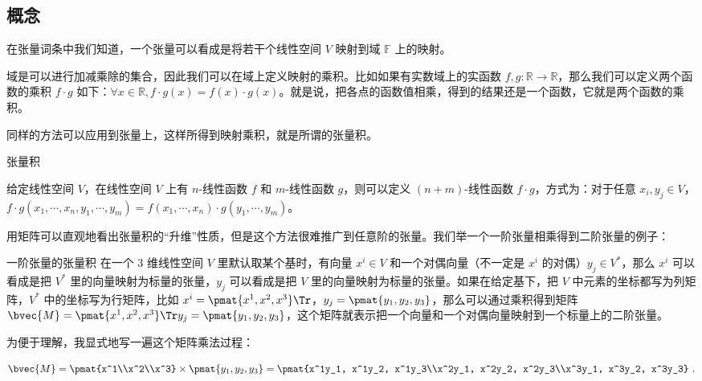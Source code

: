 
\begin{issues}
\end{issues}



\subsection{概念}
在张量词条中我们知道，一个张量可以看成是将若干个线性空间 $V$ 映射到域 $\mathbb{F}$ 上的映射。

域是可以进行加减乘除的集合，因此我们可以在域上定义映射的乘积。比如如果有实数域上的实函数 $f, g:\mathbb{R} \rightarrow \mathbb{R}$，那么我们可以定义两个函数的乘积 $f \cdot g$ 如下：$\forall x \in \mathbb{R}, f \cdot g(x) = f(x) \cdot g(x)$。就是说，把各点的函数值相乘，得到的结果还是一个函数，它就是两个函数的乘积。

同样的方法可以应用到张量上，这样所得到映射乘积，就是所谓的张量积。

\begin{definition}{张量积}\label{def_TsrPrd_1}

给定线性空间 $V$，在线性空间 $V$ 上有 $n$-线性函数 $f$ 和 $m$-线性函数 $g$，则可以定义 $(n+m)$-线性函数 $f\cdot g$，方式为：对于任意 $x_i, y_j\in V$，$f\cdot g(x_1, \cdots, x_n, y_1, \cdots, y_m)=f(x_1, \cdots, x_n)\cdot g(y_1, \cdots, y_m)$。

\end{definition}

用矩阵可以直观地看出张量积的“升维”性质，但是这个方法很难推广到任意阶的张量。我们举一个一阶张量相乘得到二阶张量的例子：

\begin{example}{一阶张量的张量积}
在一个 $3$ 维线性空间 $V$ 里默认取某个基时，有向量 $x^i\in V$ 和一个对偶向量（不一定是 $x^i$ 的对偶）$y_j\in V^*$，那么 $x^i$ 可以看成是把 $V^*$ 里的向量映射为标量的张量，$y_j$ 可以看成是把 $V$ 里的向量映射为标量的张量。如果在给定基下，把 $V$ 中元素的坐标都写为列矩阵，$V^*$ 中的坐标写为行矩阵，比如 $x^i=\pmat{x^1, x^2, x^3}\Tr$，$y_j=\pmat{y_1, y_2, y_3}$，那么可以通过乘积得到矩阵 $\bvec{M}=\pmat{x^1, x^2, x^3}\Tr y_j=\pmat{y_1, y_2, y_3}$，这个矩阵就表示把一个向量和一个对偶向量映射到一个标量上的二阶张量。

为便于理解，我显式地写一遍这个矩阵乘法过程：

\begin{equation}
\bvec{M}=\pmat{x^1\\x^2\\x^3}\times\pmat{y_1, y_2, y_3}=\pmat{x^1y_1, x^1y_2, x^1y_3\\x^2y_1, x^2y_2, x^2y_3\\x^3y_1, x^3y_2, x^3y_3}~.
\end{equation}
\end{example}

